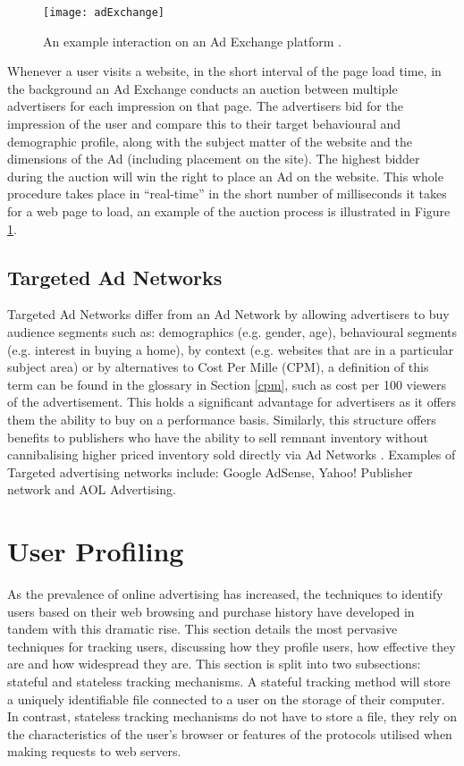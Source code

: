 \documentclass[12pt]{article}
\begin{document}
\begin{figure}[H]
    \centering
    \texttt{[image: adExchange]}
    \caption{An example interaction on an Ad Exchange platform \parencite{adExchanges}.}
    \label{fig:adExchange}
\end{figure}

Whenever a user visits a website, in the short interval of the page load time, in the background an Ad Exchange conducts an auction between multiple advertisers for each impression on that page. The advertisers bid for the impression of the user and compare this to their target behavioural and demographic profile, along with the subject matter of the website and the dimensions of the Ad (including placement on the site). The highest bidder during the auction will win the right to place an Ad on the website. This whole procedure takes place in ``real-time'' in the short number of milliseconds it takes for a web page to load, an example of the auction process is illustrated in Figure \ref{fig:adExchange}. 

\subsection{ Targeted Ad Networks}
Targeted Ad Networks differ from an Ad Network by allowing advertisers to buy audience segments such as: demographics (e.g. gender, age),  behavioural segments (e.g. interest in buying a home), by context (e.g. websites that are in a particular subject area) or by alternatives to Cost Per Mille (CPM), a definition of this term can be found in the glossary in Section \ref{cpm}, such as cost per 100 viewers of the advertisement. This holds a significant advantage for advertisers as it offers them the ability to buy on a performance basis. Similarly, this structure offers benefits to publishers who have the ability to sell remnant inventory without cannibalising higher priced inventory sold directly via Ad Networks \parencite{adExchanges}. Examples of Targeted advertising networks include: Google AdSense, Yahoo! Publisher network and AOL Advertising.

\pagebreak

\section{User Profiling} \label{userProfiling}
As the prevalence of online advertising has increased, the techniques to identify users based on their web browsing and purchase history have developed in tandem with this dramatic rise. This section details the most pervasive techniques for tracking users, discussing how they profile users, how effective they are and how widespread they are. This section is split into two subsections: stateful and stateless tracking mechanisms. A stateful tracking method will store a uniquely identifiable file connected to a user on the storage of their computer. In contrast, stateless tracking mechanisms do not have to store a file, they rely on the characteristics of the user's browser or features of the protocols utilised when making requests to web servers.
\end{document}
